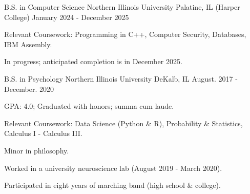 

\begin{cventries}

  \cventry
  {B.S. in Computer Science} %
  {Northern Illinois University} %
    {Palatine, IL (Harper College)} %
    {January 2024 - December 2025} %
    {
      \begin{cvitems} %
        \item {Relevant Coursework: Programming in C++, Computer Security, Databases, IBM Assembly.}
        \item {In progress; anticipated completion is in December 2025.}
      \end{cvitems}
    }

  \cventry
  {B.S. in Psychology} %
  {Northern Illinois University} %
    {DeKalb, IL} %
    {August. 2017 - December. 2020} %
    {
      \begin{cvitems} %
        \item {GPA: 4.0; Graduated with honors; summa cum laude.}
        \item {Relevant Coursework: Data Science (Python \& R), Probability \& Statistics, Calculus I - Calculus III.}
        \item {Minor in philosophy.}
        \item {Worked in a university neuroscience lab (August 2019 - March 2020).}
        \item {Participated in eight years of marching band (high school \& college).}
      \end{cvitems}
    }

\end{cventries}
